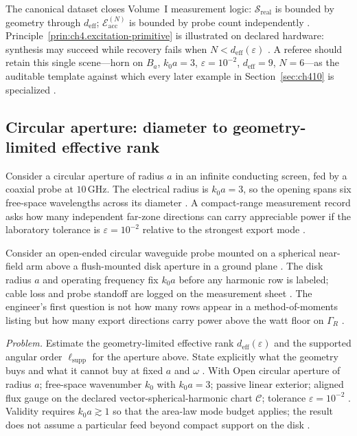 The canonical dataset closes Volume~I measurement logic: $\mathcal{S}_{\mathrm{real}}$ is bounded by geometry through $d_{\mathrm{eff}}$; $\mathcal{E}_{\mathrm{acc}}^{(N)}$ is bounded by probe count independently . Principle~\ref{prin:ch4.excitation-primitive} is illustrated on declared hardware: synthesis may succeed while recovery fails when $N<d_{\mathrm{eff}}(\varepsilon)$ . A referee should retain this single scene---horn on $B_{a}$, $k_{0}a=3$, $\varepsilon=10^{-2}$, $d_{\mathrm{eff}}=9$, $N=6$---as the auditable template against which every later example in Section~\ref{sec:ch410} is specialized .
\subsection{Circular aperture: diameter to geometry-limited effective rank}
\label{sec:ch4105}
Consider a circular aperture of radius $a$ in an infinite conducting screen, fed by a coaxial probe at $10\,\mathrm{GHz}$. The electrical radius is $k_{0}a=3$, so the opening spans six free-space wavelengths across its diameter \cite{collin2001}. A compact-range measurement record asks how many independent far-zone directions can carry appreciable power if the laboratory tolerance is $\varepsilon=10^{-2}$ relative to the strongest export mode \cite{harrington2001}.
\begin{physicalvignette}
Consider an open-ended circular waveguide probe mounted on a spherical near-field arm above a flush-mounted disk aperture in a ground plane \cite{hansen1988}. The disk radius $a$ and operating frequency fix $k_{0}a$ before any harmonic row is labeled; cable loss and probe standoff are logged on the measurement sheet \cite{stratton1941}. The engineer's first question is not how many rows appear in a method-of-moments listing but how many export directions carry power above the watt floor on $\Gamma_{R}$ \cite{devaney2004}.
\end{physicalvignette}
\emph{Problem.} Estimate the geometry-limited effective rank $d_{\mathrm{eff}}(\varepsilon)$ and the supported angular order $\ell_{\mathrm{supp}}$ for the aperture above. State explicitly what the geometry buys and what it cannot buy at fixed $a$ and $\omega$ .
With Open circular aperture of radius $a$; free-space wavenumber $k_{0}$ with $k_{0}a=3$; passive linear exterior; aligned flux gauge on the declared vector-spherical-harmonic chart $\mathcal{C}$; tolerance $\varepsilon=10^{-2}$ . Validity requires $k_{0}a\gtrsim1$ so that the area-law mode budget applies; the result does not assume a particular feed beyond compact support on the disk .
